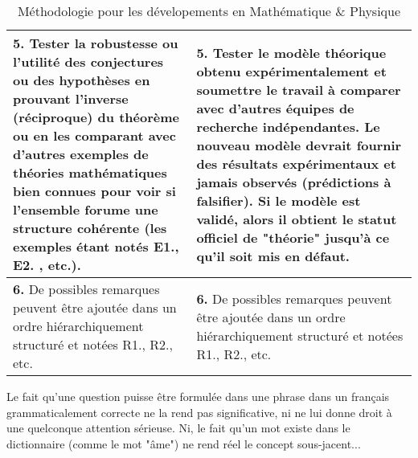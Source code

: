 \begin{table}[H]
\begin{tabular}{|p{7.5cm}|p{7.5cm}|}
				\textbf{5.} Tester la robustesse ou l'utilit\'e des conjectures ou des hypothèses en prouvant l'inverse (r\'eciproque) du th\'eorème ou en les comparant avec d'autres exemples de th\'eories math\'ematiques bien connues pour voir si l'ensemble forume une structure coh\'erente (les exemples \'etant not\'es E1., E2. , etc.). & \textbf{5.} Tester le modèle th\'eorique obtenu exp\'erimentalement  et soumettre le travail à comparer avec d'autres \'equipes de recherche ind\'ependantes. Le nouveau modèle devrait fournir des r\'esultats exp\'erimentaux et jamais observ\'es (pr\'edictions à falsifier). Si le modèle est valid\'e, alors il obtient le statut officiel de "th\'eorie" jusqu'à ce qu'il soit mis en d\'efaut. \\ \hline
				\textbf{6.} De possibles remarques peuvent être ajout\'ee dans un ordre hi\'erarchiquement structur\'e et not\'ees R1., R2., etc. & \textbf{6.} De possibles remarques peuvent être ajout\'ee dans un ordre hi\'erarchiquement structur\'e et not\'ees R1., R2., etc.			
				\\ \hline
		\end{tabular}
		\caption{M\'ethodologie pour les d\'evelopements en Math\'ematique \& Physique}
	\end{table}	
	
	\begin{tcolorbox}[title=Remark,colframe=black,arc=10pt]
	Le fait qu'une question puisse être formulée dans une phrase dans un français grammaticalement correcte ne la rend pas significative, ni ne lui donne droit à une quelconque attention sérieuse. Ni, le fait qu'un mot existe dans le dictionnaire (comme le mot "âme") ne rend réel le concept sous-jacent...
	\end{tcolorbox}
	
